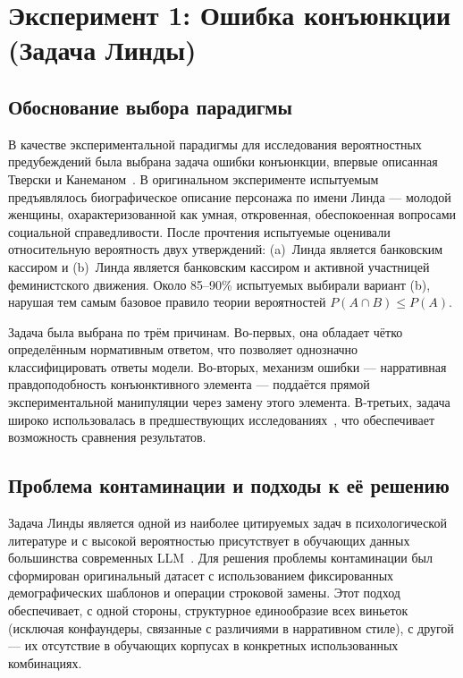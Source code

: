 \section{Эксперимент 1: Ошибка конъюнкции (Задача Линды)}

\subsection{Обоснование выбора парадигмы}

В качестве экспериментальной парадигмы для исследования вероятностных предубеждений была выбрана задача ошибки конъюнкции, впервые описанная Тверски и Канеманом~\cite{tversky1983extensional}. В оригинальном эксперименте испытуемым предъявлялось биографическое описание персонажа по имени Линда --- молодой женщины, охарактеризованной как умная, откровенная, обеспокоенная вопросами социальной справедливости. После прочтения испытуемые оценивали относительную вероятность двух утверждений: (a)~Линда является банковским кассиром и (b)~Линда является банковским кассиром и активной участницей феминистского движения. Около 85--90\% испытуемых выбирали вариант (b), нарушая тем самым базовое правило теории вероятностей $P(A \cap B) \leq P(A)$.

Задача была выбрана по трём причинам. Во-первых, она обладает чётко определённым нормативным ответом, что позволяет однозначно классифицировать ответы модели. Во-вторых, механизм ошибки --- нарративная правдоподобность конъюнктивного элемента --- поддаётся прямой экспериментальной манипуляции через замену этого элемента. В-третьих, задача широко использовалась в предшествующих исследованиях~\cite{suri2024large, wang2024linda, jiang2024peek, macmillan2024irrationality}, что обеспечивает возможность сравнения результатов.

\subsection{Проблема контаминации и подходы к её решению}

Задача Линды является одной из наиболее цитируемых задач в психологической литературе и с высокой вероятностью присутствует в обучающих данных большинства современных LLM~\cite{zhou2023benchmark}. Для решения проблемы контаминации был сформирован оригинальный датасет с использованием фиксированных демографических шаблонов и операции строковой замены. Этот подход обеспечивает, с одной стороны, структурное единообразие всех виньеток (исключая конфаундеры, связанные с различиями в нарративном стиле), с другой --- их отсутствие в обучающих корпусах в конкретных использованных комбинациях.

